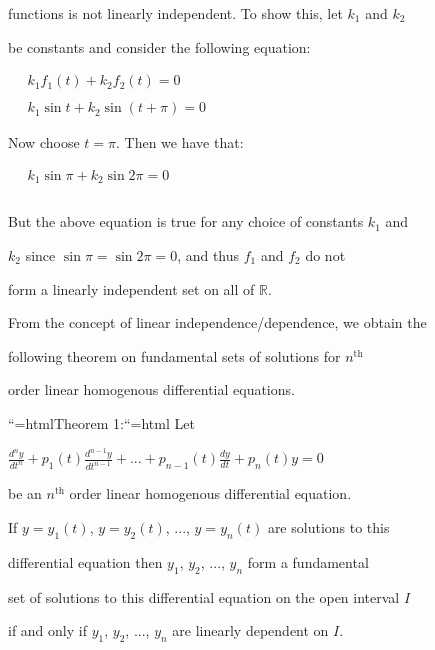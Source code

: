 functions is not linearly independent. To show this, let $k_1$ and $k_2$

be constants and consider the following equation:



$\begin{aligned} \quad k_1f_1(t) + k_2f_2(t) = 0 \\\\ \quad k_1 \sin t + k_2 \sin (t + \pi) = 0 \end{aligned}$



Now choose $t = \pi$. Then we have that:



$\begin{aligned} \quad k_1 \sin \pi + k_2 \sin 2\pi = 0 \\\\ \end{aligned}$



But the above equation is true for any choice of constants $k_1$ and

$k_2$ since $\sin \pi = \sin 2\pi = 0$, and thus $f_1$ and $f_2$ do not

form a linearly independent set on all of $\mathbb{R}$.



From the concept of linear independence/dependence, we obtain the

following theorem on fundamental sets of solutions for $n^{\mathrm{th}}$

order linear homogenous differential equations.







``{=html}Theorem 1:``{=html} Let

$\frac{d^ny}{dt^n} + p_1(t) \frac{d^{n-1}y}{dt^{n-1}} + ... + p_{n-1}(t) \frac{dy}{dt} + p_n(t)y = 0$

be an $n^{\mathrm{th}}$ order linear homogenous differential equation.

If $y = y_1(t)$, $y = y_2(t)$, ..., $y = y_n(t)$ are solutions to this

differential equation then $y_1$, $y_2$, ..., $y_n$ form a fundamental

set of solutions to this differential equation on the open interval $I$

if and only if $y_1$, $y_2$, ..., $y_n$ are linearly dependent on $I$.







